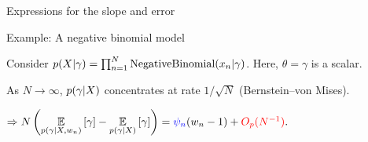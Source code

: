\begin{frame}[t]{Expressions for the slope and error}


\end{frame}




\begin{frame}[t]{Example: A negative binomial model}

    
    Consider $p(X \vert \gamma) = \prod_{n=1}^N \textrm{NegativeBinomial}(x_n \vert \gamma)$. Here, $\theta = \gamma$ is a scalar.  
    
    \pause
    As $N \rightarrow \infty$, $p(\gamma \vert X)$ concentrates at rate $1 / \sqrt{N}$ (Bernstein--von Mises).
    
    $\Rightarrow 
    N \left( \underset{p(\gamma \vert X, w_n)}{\mathbb{E}}\left[\gamma\right] -
    \underset{p(\gamma \vert X)}{\mathbb{E}}\left[\gamma\right] \right) = \textcolor{blue}{\psi_n} (w_n - 1) + \textcolor{red}{O_p(N^{-1})}.
    $
    
    
    \pause
    \vspace{1.5em}
    \LowDimAccuracyGraph{}
    
    \pause

\end{frame}